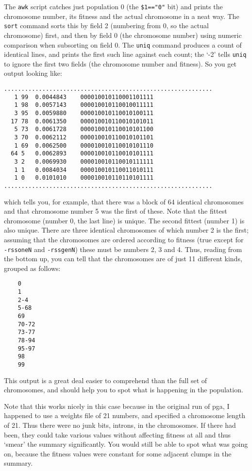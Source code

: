 The \verb|awk| script catches just population 0 (the \verb|$1=="0"|
bit) and prints the chromosome number, its fitness and the actual
chromosome in a neat way. The \verb|sort| command sorts this by field
2 (numbering from 0, so the actual chromosome) first, and then by
field 0 (the chromosome number) using numeric comparison when
subsorting on field 0. The \verb|uniq| command produces a count of
identical lines, and prints the first such line against each count;
the `-2' tells \verb|uniq| to ignore the first two fields (the
chromosome number and fitness). So you get output looking like:
\begin{verbatim}
............................................................
   1 99  0.0044843    000010010110001101111
   1 98  0.0057143    000010010110010011111
   3 95  0.0059880    000010010110010100111
  17 78  0.0061350    000010010110010101011
   5 73  0.0061728    000010010110010101100
   3 70  0.0062112    000010010110010101101
   1 69  0.0062500    000010010110010101110
  64 5   0.0062893    000010010110010101111
   3 2   0.0069930    000010010110010111111
   1 1   0.0084034    000010010110011010111
   1 0   0.0101010    000010010110110101111
............................................................
\end{verbatim}
which tells you, for example, that there was a block of 64 identical
chromosomes and that chromosome number 5 was the first of these. Note
that the fittest chromosome (number 0, the last line) is unique. The
second fittest (number 1) is also unique. There are three identical
chromosomes of which number 2 is the first; assuming that the chromosomes
are ordered according to fitness (true except for \verb|-rssoneN| and
\verb|-rssgenN|) these must be numbers 2, 3 and 4. Thus, reading from 
the bottom up, you can tell that the chromosomes are of just 11
different kinds, grouped as follows:
\begin{verbatim}
    0
    1
    2-4
    5-68
    69
    70-72
    73-77
    78-94
    95-97
    98
    99
\end{verbatim}
This output is a great deal easier to comprehend than the full set
of chromosomes, and should help you to spot what is happening in the
population.

Note that this works nicely in this case because in the original run of
pga, I happened to use a weights file of 21 numbers, and specified
a chromosome length of 21. Thus there were no junk bits, introns, in the
chromosomes. If there had been, they could take various values without
affecting fitness at all and thus `smear' the summary significantly.
You would still be able to spot what was going on, because the fitness
values were constant for some adjacent clumps in the summary.

